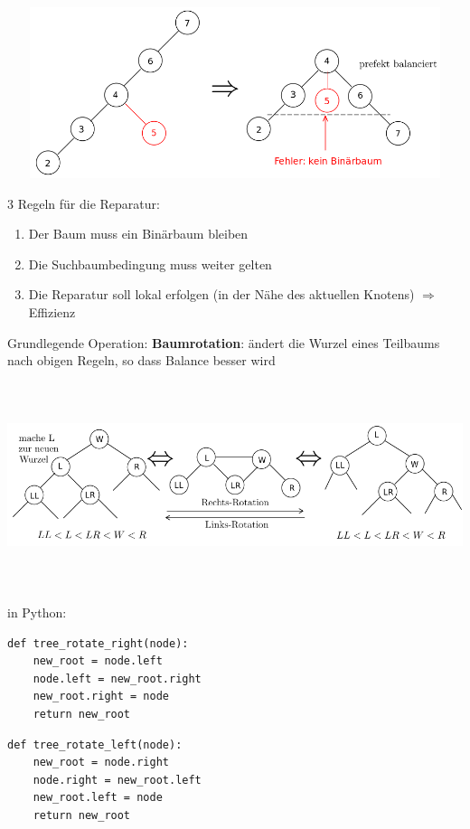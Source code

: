 \includegraphics[width=15cm,height=5cm,keepaspectratio]{./Pictures/Reparatur.png}

3 Regeln für die Reparatur:
\begin{enumerate}
    \item Der Baum muss ein Binärbaum bleiben
    \item Die Suchbaumbedingung muss weiter gelten
    \item Die Reparatur soll lokal erfolgen (in der Nähe des aktuellen Knotens) $\Rightarrow$ Effizienz
\end{enumerate}

Grundlegende Operation: \textbf{Baumrotation}: ändert die Wurzel eines Teilbaums nach obigen Regeln, so dass Balance besser wird

\includegraphics[width=16cm,height=6cm,keepaspectratio]{./Pictures/Rotation.png}

in Python:
\begin{verbatim}
def tree_rotate_right(node):
    new_root = node.left
    node.left = new_root.right
    new_root.right = node
    return new_root
\end{verbatim}

\begin{verbatim}
def tree_rotate_left(node):
    new_root = node.right
    node.right = new_root.left
    new_root.left = node
    return new_root
\end{verbatim}

